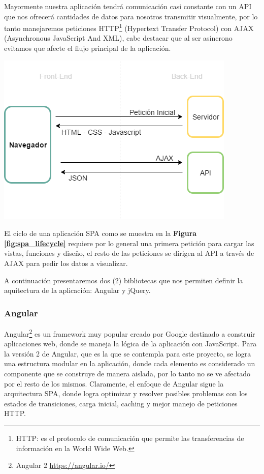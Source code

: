 Mayormente nuestra aplicación tendrá comunicación casi constante con un API que nos ofrecerá cantidades de datos para nosotros transmitir visualmente, por lo tanto manejaremos peticiones HTTP\footnote{HTTP: es el protocolo de comunicación que permite las transferencias de información en la World Wide Web.} (Hypertext Transfer Protocol) con AJAX \cite{AJAX} (Asynchronous JavaScript And XML), cabe destacar que al ser asíncrono evitamos que afecte el flujo principal de la aplicación.
\begin{center}
\includegraphics[scale=0.6]{images/marco_tecnologico/spa_lifecycle.png}
\label{fig:spa_lifecycle}
\end{center}
El ciclo de una aplicación SPA como se muestra en la \textbf{Figura \ref{fig:spa_lifecycle}} requiere por lo general una primera petición para cargar las vistas, funciones y diseño, el resto de las peticiones se dirigen al API a través de AJAX para pedir los datos a visualizar.

A continuación presentaremos dos (2) bibliotecas que nos permiten definir la aquitectura de la aplicación: Angular y jQuery.

\subsubsection{Angular}
Angular\footnote{Angular 2 \url{https://angular.io/}} es un framework muy popular creado por Google destinado a construir aplicaciones web, donde se maneja la lógica de la aplicación con JavaScript. Para la versión 2 de Angular, que es la que se contempla para este proyecto, se logra una estructura modular en la aplicación, donde cada elemento es considerado un componente que se construye de manera aislada, por lo tanto no se ve afectado por el resto de los mismos. Claramente, el enfoque de Angular sigue la arquitectura SPA, donde logra optimizar y resolver posibles problemas con los estados de transiciones, carga inicial, caching y mejor manejo de peticiones HTTP.

